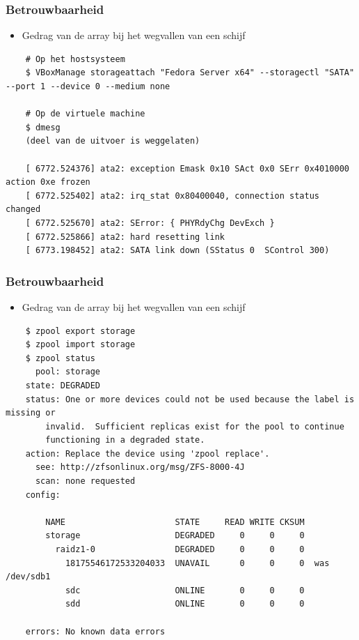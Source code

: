 \documentclass{beamer}
\begin{document}
\begin{frame}[fragile]
  \frametitle{Betrouwbaarheid}
  \begin{itemize}
    \item Gedrag van de array bij het wegvallen van een schijf
  \end{itemize}
  \begin{verbatim}
    # Op het hostsysteem
    $ VBoxManage storageattach "Fedora Server x64" --storagectl "SATA" --port 1 --device 0 --medium none

    # Op de virtuele machine
    $ dmesg
    (deel van de uitvoer is weggelaten)

    [ 6772.524376] ata2: exception Emask 0x10 SAct 0x0 SErr 0x4010000 action 0xe frozen
    [ 6772.525402] ata2: irq_stat 0x80400040, connection status changed
    [ 6772.525670] ata2: SError: { PHYRdyChg DevExch } 
    [ 6772.525866] ata2: hard resetting link
    [ 6773.198452] ata2: SATA link down (SStatus 0  SControl 300)
  \end{verbatim}
\end{frame}

\begin{frame}[fragile]
  \frametitle{Betrouwbaarheid}
  \begin{itemize}
    \item Gedrag van de array bij het wegvallen van een schijf
  \end{itemize}
  \begin{verbatim}
    $ zpool export storage
    $ zpool import storage
    $ zpool status 
      pool: storage
    state: DEGRADED
    status: One or more devices could not be used because the label is missing or
	    invalid.  Sufficient replicas exist for the pool to continue
	    functioning in a degraded state.
    action: Replace the device using 'zpool replace'.
      see: http://zfsonlinux.org/msg/ZFS-8000-4J
      scan: none requested
    config:

	    NAME                      STATE     READ WRITE CKSUM
	    storage                   DEGRADED     0     0     0
	      raidz1-0                DEGRADED     0     0     0
	        18175546172533204033  UNAVAIL      0     0     0  was /dev/sdb1
	        sdc                   ONLINE       0     0     0
	        sdd                   ONLINE       0     0     0

    errors: No known data errors
  \end{verbatim}
\end{frame}
\end{document}
